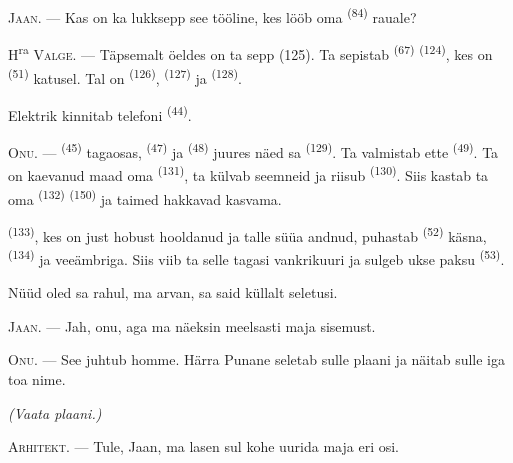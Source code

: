 \textsc{Jaan}. --- Kas on ka lukksepp see tööline, kes lööb oma 
\textsuperscript{(84)} rauale?

H\textsuperscript{ra} \textsc{Valge}. --- Täpsemalt öeldes on ta sepp (125). Ta sepistab
 \textsuperscript{(67)}  \textsuperscript{(124)}, kes
on  \textsuperscript{(51)} katusel. Tal on 
\textsuperscript{(126)},  \textsuperscript{(127)} ja 
\textsuperscript{(128)}.

Elektrik kinnitab telefoni  \textsuperscript{(44)}.

\VUsaut{3.0mm}

\textsc{Onu}. ---  \textsuperscript{(45)} tagaosas, 
\textsuperscript{(47)} ja  \textsuperscript{(48)} juures näed sa
 \textsuperscript{(129)}. Ta valmistab ette 
\textsuperscript{(49)}. Ta on kaevanud maad oma  \textsuperscript{(131)},
ta külvab seemneid ja riisub  \textsuperscript{(130)}. Siis kastab ta oma
 \textsuperscript{(132)}  \textsuperscript{(150)} ja
taimed hakkavad kasvama.

 \textsuperscript{(133)}, kes on just hobust hooldanud ja talle süüa
andnud, puhastab  \textsuperscript{(52)} käsna, 
\textsuperscript{(134)} ja veeämbriga. Siis viib ta selle tagasi vankrikuuri ja sulgeb
ukse paksu  \textsuperscript{(53)}.

Nüüd oled sa rahul, ma arvan, sa said küllalt seletusi.

\textsc{Jaan}. --- Jah, onu, aga ma näeksin meelsasti maja sisemust.

\textsc{Onu}. --- See juhtub homme. Härra Punane seletab sulle plaani ja näitab sulle
iga toa nime.

\VUsaut{3.0mm}
\VUsaut{2.4mm}

{\centering\textit{(Vaata plaani.)}\par}
\VUsaut{2.4mm}

\textsc{Arhitekt}. --- Tule, Jaan, ma lasen sul kohe uurida maja eri osi.

